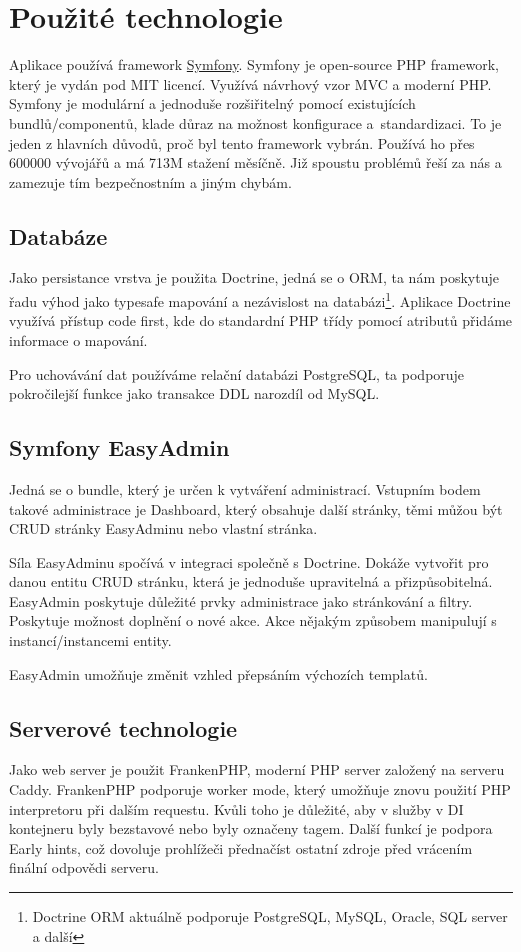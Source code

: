 
\section{Použité technologie}

Aplikace používá framework \href{https://symfony.com/}{Symfony}.
Symfony je open-source PHP framework, který je vydán pod MIT licencí.
Využívá návrhový vzor MVC a moderní PHP.
Symfony je modulární a jednoduše rozšiřitelný pomocí existujících bundlů/componentů, klade důraz na možnost konfigurace a~standardizaci.
To je jeden z hlavních důvodů, proč byl tento framework vybrán.
Používá ho přes 600000 vývojářů a má 713M stažení měsíčně.\cite{symfony:what-is}
Již spoustu problémů řeší za nás a zamezuje tím bezpečnostním a jiným chybám.


\subsection{Databáze}
Jako persistance vrstva je použita Doctrine, jedná se o ORM, ta nám poskytuje řadu výhod jako typesafe mapování a nezávislost na databázi\footnote{Doctrine ORM aktuálně podporuje PostgreSQL, MySQL, Oracle, SQL server a další\cite{doctrine-supported-dbs}}.
Aplikace Doctrine využívá přístup code first, kde do standardní PHP třídy pomocí atributů přidáme informace o mapování. 

Pro uchovávání dat používáme relační databázi PostgreSQL, ta podporuje pokročilejší funkce jako transakce DDL narozdíl od MySQL.  


\subsection{Symfony EasyAdmin}

Jedná se o bundle, který je určen k vytváření administrací.
Vstupním bodem takové administrace je Dashboard, který obsahuje další stránky, těmi můžou být CRUD stránky EasyAdminu nebo vlastní stránka.

Síla EasyAdminu spočívá v integraci společně s Doctrine.
Dokáže vytvořit pro danou entitu CRUD stránku, která je jednoduše upravitelná a přizpůsobitelná.
EasyAdmin poskytuje důležité prvky administrace jako stránkování a filtry.
Poskytuje možnost doplnění o nové akce. Akce nějakým způsobem manipulují s instancí/instancemi entity.

EasyAdmin umožňuje změnit vzhled přepsáním výchozích templatů.


\subsection{Serverové technologie}
Jako web server je použit FrankenPHP, moderní PHP server založený na serveru Caddy.
FrankenPHP podporuje worker mode, který umožňuje znovu použití PHP interpretoru při dalším requestu. Kvůli toho je důležité, aby v služby v DI kontejneru byly bezstavové nebo byly označeny  tagem.
Další funkcí je podpora Early hints, což dovoluje prohlížeči přednačíst ostatní zdroje před vrácením finální odpovědi serveru.

